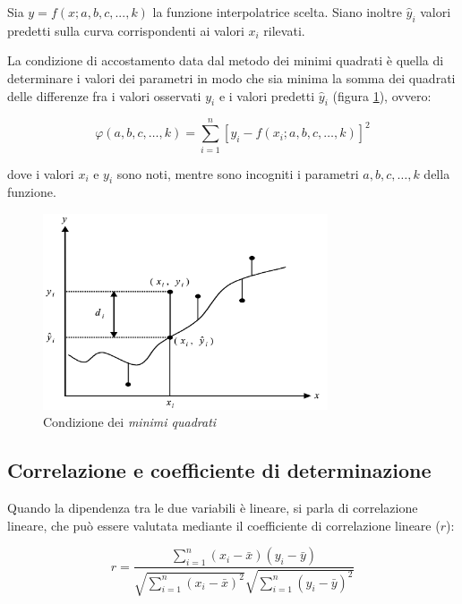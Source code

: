 Sia $y=f(x; a, b, c, ..., k)$ la funzione interpolatrice scelta. Siano inoltre $\hat{y}_{i}$ valori predetti sulla curva corrispondenti ai valori $x_i$ rilevati.

La condizione di accostamento data dal metodo dei minimi quadrati è quella di determinare i valori dei parametri in modo che sia minima la somma dei quadrati delle differenze fra i valori osservati $y_i$ e i valori predetti $\hat{y}_i$ (figura \ref{fig:minimi_quadrati}), ovvero:

$$\varphi(a, b, c, \ldots, k)=\sum_{i=1}^{n}\left[y_{i}-f\left(x_{i} ; a, b, c, \ldots, k\right)\right]^{2}$$\smallskip

dove i valori $x_i$ e $y_i$ sono noti, mentre sono incogniti i parametri $a , b , c , … , k$ della funzione. \cite{excel_per_statistica_belluco}

\begin{figure}[H]
\centering
\includegraphics[width=0.75\textwidth,height=\textheight,keepaspectratio]{img/minimi_quadrati.png}
\caption{Condizione dei \textit{minimi quadrati} \cite{excel_per_statistica_belluco}}
\label{fig:minimi_quadrati}
\end{figure}

\subsection{Correlazione e coefficiente di determinazione}\label{ssec:regressione-correlazione}

Quando la dipendenza tra le due variabili è lineare, si parla di correlazione lineare, che può essere valutata mediante il coefficiente di correlazione lineare ($r$):

$$r=\frac{\sum_{i=1}^{n}\left(x_{i}-\bar{x}\right)\left(y_{i}-\bar{y}\right)}{\sqrt{\sum_{i=1}^{n}\left(x_{i}-\bar{x}\right)^{2}} \sqrt{\sum_{i=1}^{n}\left(y_{i}-\bar{y}\right)^{2}}}$$\smallskip


